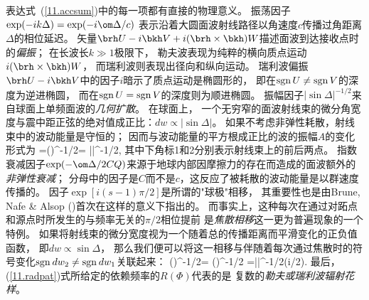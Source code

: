 表达式~(\ref{11.accsum})中的每一项都有直接的物理意义。
振荡因子$\exp(-ik\Delta)=\exp(-i\om\Delta/c)$ 表示沿着大圆面波射线路径以角速度$c$传播过角距离$\Delta$的相位延迟。
矢量$\brh U-i\bkh V+i(\brh\times\bkh)W$描述面波到达接收点时的{\em 偏振\/}；
%
%
在长波长$k\gg 1$极限下，
勒夫波表现为纯粹的横向质点运动$i(\brh\times\bkh)W$，
%
%
%
而瑞利波则表现出径向和纵向运动。
瑞利波偏振$\brh U-i\bkh V$中的因子$i$暗示了质点运动是椭圆形的，
%
%
%
即在${\rm sgn}\,U\not={\rm sgn}\,V$的深度为逆进椭圆，
而在${\rm sgn}\,U={\rm sgn}\,V$的深度则为顺进椭圆。
振幅因子$|\sin\Delta|^{-1/2}$来自球面上单频面波的{\em 几何扩散\/}。
%
在球面上，
一个无穷窄的面波射线束的微分角宽度与震中距正弦的绝对值成正比：$dw\propto|\sin\Delta|$。
如果不考虑非弹性耗散，射线束中的波动能量是守恒的；
因而与波动能量的平方根成正比的波的振幅$A$的变化形式为
\eq
{}=\left(\right)^{-1/2}=
\left|\right|^{-1/2},
\en
其中下角标1和2分别表示射线束上的前后两点。
指数衰减因子$\exp(-\om\Delta/2CQ)$来源于地球内部因摩擦力的存在而造成的面波额外的{\em 非弹性衰减\/}；
%
%
分母中的因子是$C$而不是$c$，这反应了被耗散的波动能量是以群速度传播的。
因子$\exp[i(s-1)\pi/2]$是所谓的"球极"相移，
%
%
其重要性也是由Brune, Nafe \& Alsop (\citeyear{brune&al61})首次在这样的意义下指出的。
而事实上，这种每次在通过对跖点和源点时所发生的与频率无关的$\pi/2$相位提前
是{\em 焦散相移\/}这一更为普遍现象的一个特例。
%
%
如果将射线束的微分宽度视为一个随着总的传播距离而平滑变化的正负值函数，
即$dw\propto\sin\Delta$，
那么我们便可以将这一相移与伴随着每次通过焦散时的符号变化${\rm sgn}\hspace{0.7 mm}dw_2\not={\rm sgn}\hspace{0.7 mm}dw_1$关联起来：
\eq \label{11.piover2}
\left(\right)^{-1/2}=
\left(\right)^{-1/2}
=\left|\right|^{-1/2}\exp(i\pi/2).
\en
最后，(\ref{11.radpat})式所给定的依赖频率的$R(\Phi)$代表的是
复数的{\em 勒夫或瑞利波辐射花样\/}。
%
%
%
%

